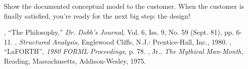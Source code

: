 Show the documented conceptual model to the customer. When the
customer is finally satisfied, you're ready for the next big step: the
design!

\begin{references}{9}
 , ``The \Forth{} Philosophy,''
  \emph{Dr. Dobb's Journal,} Vol. 6, Iss. 9, No. 59 (Sept. 81),
  pp. 6-11.
 , \emph{Structured Analysis,}
  Englewood Cliffs, N.J.: Prentice-Hall, Inc., 1980.
 , ``LaFORTH'',
  \emph{1980 FORML Proceedings,} p. 78.
 , Jr., \emph{The Mythical
  Man-Month,} Reading, Massachusetts, Addison-Wesley, 1975.
\end{references}

